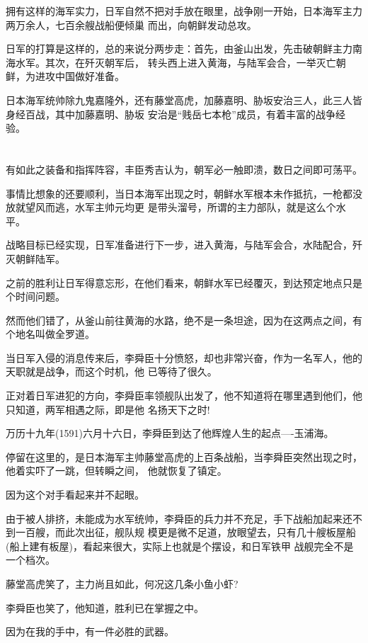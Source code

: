 \documentclass[11pt,a4paper,onecolumn]{article}
\begin{document}
拥有这样的海军实力，日军自然不把对手放在眼里，战争刚一开始，日本海军主力两万余人，七百余艘战船便倾巢
而出，向朝鲜发动总攻。

日军的打算是这样的，总的来说分两步走：首先，由釜山出发，先击破朝鲜主力南海水军。其次，在歼灭朝军后，
转头西上进入黄海，与陆军会合，一举灭亡朝鲜，为进攻中国做好准备。

日本海军统帅除九鬼嘉隆外，还有藤堂高虎，加藤嘉明、胁坂安治三人，此三人皆身经百战，其中加藤嘉明、胁坂
安治是``贱岳七本枪''成员，有着丰富的战争经验。

\section[\thesection]{}

有如此之装备和指挥阵容，丰臣秀吉认为，朝军必一触即溃，数日之间即可荡平。

事情比想象的还要顺利，当日本海军出现之时，朝鲜水军根本未作抵抗，一枪都没放就望风而逃，水军主帅元均更
是带头溜号，所谓的主力部队，就是这么个水平。

战略目标已经实现，日军准备进行下一步，进入黄海，与陆军会合，水陆配合，歼灭朝鲜陆军。

之前的胜利让日军得意忘形，在他们看来，朝鲜水军已经覆灭，到达预定地点只是个时间问题。

然而他们错了，从釜山前往黄海的水路，绝不是一条坦途，因为在这两点之间，有个地名叫做全罗道。

当日军入侵的消息传来后，李舜臣十分愤怒，却也非常兴奋，作为一名军人，他的天职就是战争，而这个时机，他
已等待了很久。

正对着日军进犯的方向，李舜臣率领舰队出发了，他不知道将在哪里遇到他们，他只知道，两军相遇之际，即是他
名扬天下之时!

万历十九年(1591)六月十六日，李舜臣到达了他辉煌人生的起点----玉浦海。

停留在这里的，是日本海军主帅藤堂高虎的上百条战船，当李舜臣突然出现之时，他着实吓了一跳，但转瞬之间，
他就恢复了镇定。

因为这个对手看起来并不起眼。

由于被人排挤，未能成为水军统帅，李舜臣的兵力并不充足，手下战船加起来还不到一百艘，而此次出征，舰队规
模更是微不足道，放眼望去，只有几十艘板屋船(船上建有板屋)，看起来很大，实际上也就是个摆设，和日军铁甲
战舰完全不是一个档次。

藤堂高虎笑了，主力尚且如此，何况这几条小鱼小虾?

李舜臣也笑了，他知道，胜利已在掌握之中。

因为在我的手中，有一件必胜的武器。
\end{document}
